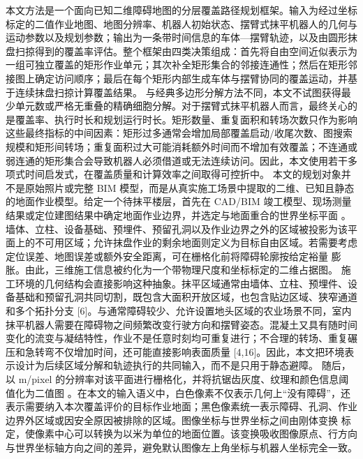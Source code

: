 \markdownRendererDocumentBegin
\markdownRendererSectionBegin
{}\markdownRendererParagraphSeparator
{}本文方法是一个面向已知二维障碍地图的分层覆盖路径规划框架。输入为经过坐标标定的二值作业地图、地图分辨率、机器人初始状态、摆臂式抹平机器人的几何与运动参数以及规划参数；输出为一条带时间信息的车体—摆臂轨迹，以及由圆形抹盘扫掠得到的覆盖率评估。整个框架由四类决策组成：首先将自由空间近似表示为一组可独立覆盖的矩形作业单元；其次补全矩形集合的邻接连通性；然后在矩形邻接图上确定访问顺序；最后在每个矩形内部生成车体与摆臂协同的覆盖运动，并基于连续抹盘扫掠计算覆盖结果。\markdownRendererParagraphSeparator
{}与经典多边形分解方法不同，本文不试图获得最少单元数或严格无重叠的精确细胞分解。对于摆臂式抹平机器人而言，最终关心的是覆盖率、执行时长和规划运行时长。矩形数量、重复面积和转场次数只作为影响这些最终指标的中间因素：矩形过多通常会增加局部覆盖启动/收尾次数、图搜索规模和矩形间转场；重复面积过大可能消耗额外时间而不增加有效覆盖；不连通或弱连通的矩形集合会导致机器人必须借道或无法连续访问。因此，本文使用若干多项式时间启发式，在覆盖质量和计算效率之间取得可控折中。\markdownRendererParagraphSeparator
{}\markdownRendererSectionBegin
{}\markdownRendererParagraphSeparator
{}\markdownRendererSectionBegin
{}\markdownRendererParagraphSeparator
{}本文的规划对象并不是原始照片或完整 BIM 模型，而是从真实施工场景中提取的二维、已知且静态的地面作业模型。给定一个待抹平楼层，首先在 CAD/BIM 竣工模型、现场测量结果或定位建图结果中确定地面作业边界，并选定与地面重合的世界坐标平面 。墙体、立柱、设备基础、预埋件、预留孔洞以及作业边界之外的区域被投影为该平面上的不可用区域；允许抹盘作业的剩余地面则定义为目标自由区域。若需要考虑定位误差、地图误差或额外安全距离，可在栅格化前将障碍轮廓按给定裕量  膨胀。由此，三维施工信息被约化为一个带物理尺度和坐标标定的二维占据图。\markdownRendererParagraphSeparator
{}施工环境的几何结构会直接影响这种抽象。抹平区域通常由墙体、立柱、预埋件、设备基础和预留孔洞共同切割，既包含大面积开放区域，也包含贴边区域、狭窄通道和多个拓扑分支 [6]。与通常障碍较少、允许设置地头区域的农业场景不同，室内抹平机器人需要在障碍物之间频繁改变行驶方向和摆臂姿态。混凝土又具有随时间变化的流变与凝结特性，作业不是任意时刻均可重复进行；不合理的转场、重复碾压和急转弯不仅增加时间，还可能直接影响表面质量 [4,16]。因此，本文把环境表示设计为后续区域分解和轨迹执行的共同输入，而不是只用于静态避障。\markdownRendererParagraphSeparator
{}随后，以  m/pixel 的分辨率对该平面进行栅格化，并将抗锯齿灰度、纹理和颜色信息阈值化为二值图 。在本文的输入语义中，白色像素不仅表示几何上“没有障碍”，还表示需要纳入本次覆盖评价的目标作业地面；黑色像素统一表示障碍、孔洞、作业边界外区域或因安全原因被排除的区域。图像坐标与世界坐标之间由刚体变换  标定，使像素中心可以转换为以米为单位的地面位置。该变换吸收图像原点、行方向与世界坐标轴方向之间的差异，避免默认图像左上角坐标与机器人坐标完全一致。\markdownRendererParagraphSeparator
